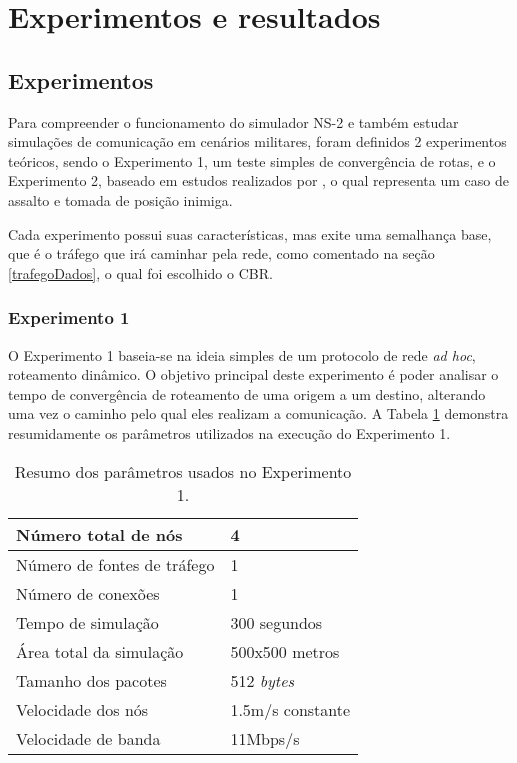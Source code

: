 \section{Experimentos e resultados}
\subsection{Experimentos}
Para compreender o funcionamento do simulador NS-2 e tamb\'em estudar simula\c{c}\~oes de comunica\c{c}\~ao em cen\'arios militares, foram definidos 2 experimentos te\'oricos, sendo o Experimento 1, um teste simples de converg\^encia de rotas, e o Experimento 2, baseado em estudos realizados por \cite{pereira}, o qual representa um caso de assalto e tomada de posi\c{c}\~ao inimiga.

Cada experimento possui suas caracter\'isticas, mas exite uma semalhan\c{c}a base, que \'e o tr\'afego que ir\'a caminhar pela rede, como comentado na se\c{c}\~ao \ref{trafegoDados}, o qual foi escolhido o CBR.

\subsubsection{Experimento 1}
O Experimento 1 baseia-se na ideia simples de um protocolo de rede \textit{ad hoc}, roteamento din\^amico.
O objetivo principal deste experimento \'e poder analisar o tempo de converg\^encia de roteamento de uma origem a um destino, alterando uma vez o caminho pelo qual eles realizam a comunica\c{c}\~ao.
A Tabela \ref{tabParamExp1} demonstra resumidamente os par\^ametros utilizados na execu\c{c}\~ao do Experimento 1.

\begin{table}[H]
	\centering
	\caption{Resumo dos par\^ametros usados no Experimento 1.}
	\begin{tabular}{ | l | l | }
		\hline
		N\'umero total de n\'os & 4 \\ \hline
		N\'umero de fontes de tr\'afego & 1 \\ \hline
		N\'umero de conex\~oes & 1 \\ \hline
		Tempo de simula\c{c}\~ao & 300 segundos \\ \hline
		\'Area total da simula\c{c}\~ao & 500x500 metros \\ \hline
		Tamanho dos pacotes & 512 \textit{bytes} \\ \hline	
		Velocidade dos n\'os & 1.5m/s constante \\ \hline
		Velocidade de banda & 11Mbps/s \\ \hline
	\end{tabular}
	\label{tabParamExp1}
\end{table}

